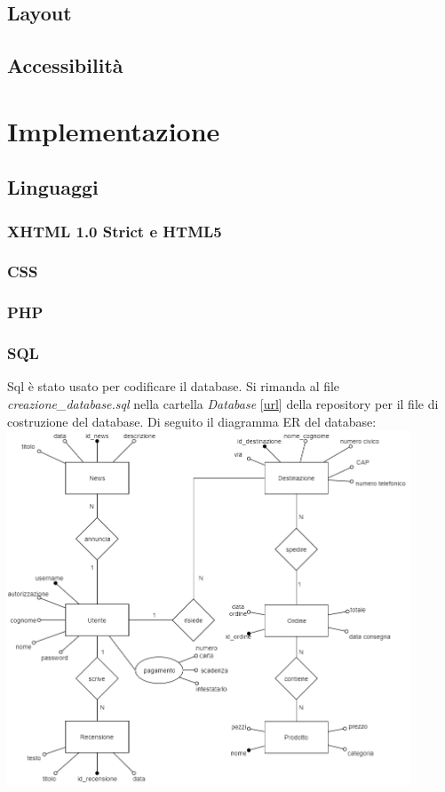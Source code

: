 \documentclass{article}
\begin{document}
		\subsection{Layout}
		\subsection{Accessibilità}
	\section{Implementazione}
		\subsection{Linguaggi}
			\subsubsection{XHTML 1.0 Strict e HTML5}
			\subsubsection{CSS}
			\subsubsection{PHP}
			\subsubsection{SQL}
			Sql è stato usato per codificare il database. Si rimanda al file \textit{creazione\_database.sql} nella cartella \textit{Database} [\href{https://github.com/Mirco469/ProgettoSushi/tree/master/Database}{url}] della repository per il file di costruzione del database. Di seguito il diagramma ER del database:\newline
			\includegraphics[width=12cm]{DiagrammaER.png}
\end{document}
